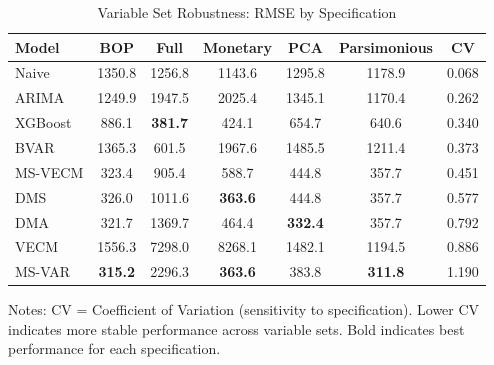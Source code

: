\begin{table}[htbp]
\centering
\small
\caption{Variable Set Robustness: RMSE by Specification}
\label{tab:varset}
\begin{tabular}{lcccccc}
\toprule
Model & BOP & Full & Monetary & PCA & Parsimonious & CV \\
\midrule
Naive & 1350.8 & 1256.8 & 1143.6 & 1295.8 & 1178.9 & 0.068 \\
ARIMA & 1249.9 & 1947.5 & 2025.4 & 1345.1 & 1170.4 & 0.262 \\
XGBoost & 886.1 & \textbf{381.7} & 424.1 & 654.7 & 640.6 & 0.340 \\
BVAR & 1365.3 & 601.5 & 1967.6 & 1485.5 & 1211.4 & 0.373 \\
MS-VECM & 323.4 & 905.4 & 588.7 & 444.8 & 357.7 & 0.451 \\
DMS & 326.0 & 1011.6 & \textbf{363.6} & 444.8 & 357.7 & 0.577 \\
DMA & 321.7 & 1369.7 & 464.4 & \textbf{332.4} & 357.7 & 0.792 \\
VECM & 1556.3 & 7298.0 & 8268.1 & 1482.1 & 1194.5 & 0.886 \\
MS-VAR & \textbf{315.2} & 2296.3 & \textbf{363.6} & 383.8 & \textbf{311.8} & 1.190 \\
\bottomrule
\end{tabular}
\begin{tablenotes}
\small
\item Notes: CV = Coefficient of Variation (sensitivity to specification). 
Lower CV indicates more stable performance across variable sets. 
Bold indicates best performance for each specification.
\end{tablenotes}
\end{table}